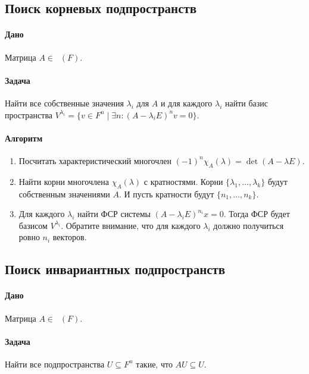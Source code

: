 \documentclass{article}
\newcommand{\Matrix}[2]{\mathop{\mathrm{M}_{#2}}(#1)}
\begin{document}
\subsection{Поиск корневых подпространств}

\paragraph{Дано} Матрица $A\in\Matrix{F}{n}$.


\paragraph{Задача} Найти все собственные значения $\lambda_i$ для $A$ и для каждого $\lambda_i$ найти базис пространства $V^{\lambda_i} = \{v\in F^{n}\mid \exists n\colon (A - \lambda_i E)^n v = 0\}$.

\paragraph{Алгоритм}
\begin{enumerate}
\item Посчитать характеристический многочлен $(-1)^n\chi_A(\lambda) = \det(A-\lambda E)$.

\item Найти корни многочлена $\chi_A(\lambda)$ с кратностями. Корни $\{\lambda_1,\ldots,\lambda_k\}$ будут собственным значениями $A$. И пусть кратности будут $\{n_1,\ldots, n_k\}$.

\item Для каждого $\lambda_i$ найти ФСР системы $(A-\lambda_i E)^{n_i}x = 0$. Тогда ФСР будет базисом $V^{\lambda_i}$. Обратите внимание, что для каждого $\lambda_i$ должно получиться ровно $n_i$ векторов.
\end{enumerate}


\subsection{Поиск инвариантных подпространств}

\paragraph{Дано} Матрица $A\in\Matrix{F}{n}$.

\paragraph{Задача} Найти все подпространства $U\subseteq F^n$ такие, что $A U \subseteq U$.
\end{document}
